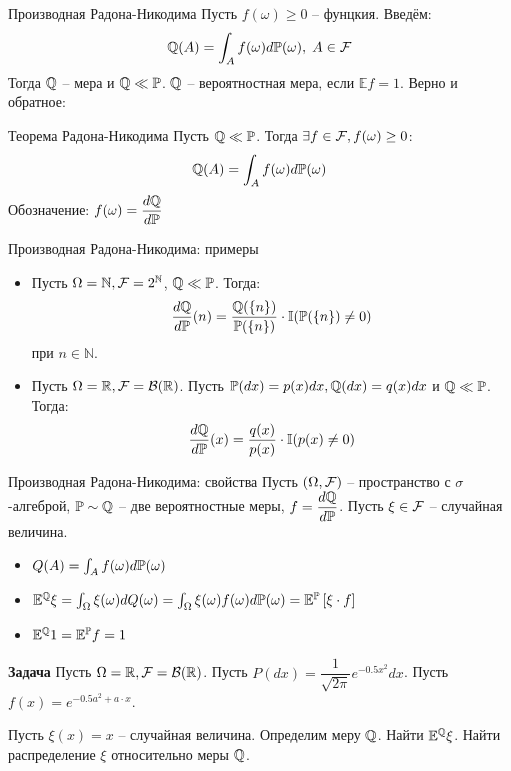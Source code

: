 \documentclass{beamer}
\begin{document}
\begin{frame}{Производная Радона-Никодима}
    Пусть $f(\omega) \geq 0 $ -- фунцкия. Введём:
    $$
        \mathbb{Q}(A) = \int_A f(\omega) d\mathbb{P}(\omega), \; A \in \mathcal{F}
    $$Тогда $\mathbb{Q}$ -- мера и $\mathbb{Q} \ll \mathbb{P}$. $\mathbb{Q}$ -- вероятностная мера, если $\mathbb{E} f=1$. Верно и обратное:
    \begin{block}{Теорема Радона-Никодима}
        Пусть $\mathbb{Q} \ll \mathbb{P}$. Тогда $\exists f \in \mathcal{F}, f(\omega) \geq 0$:
        $$
            \mathbb{Q}(A) = \int_A f(\omega) d\mathbb{P}(\omega)
        $$Обозначение: $f(\omega) = \dfrac{d\mathbb{Q}}{d\mathbb{P}}$
    \end{block}
\end{frame}

\begin{frame}{Производная Радона-Никодима: примеры}
    \begin{itemize}
        \item     Пусть $\Omega = \mathbb{N}, \mathcal{F}=2^{\mathbb{N}}$, $\mathbb{Q} \ll \mathbb{P}$.
        Тогда:
    $$
         \dfrac{d\mathbb{Q}}{d\mathbb{P}}(n) = \dfrac{\mathbb{Q}(\{n\})}{\mathbb{P}(\{n\})} \cdot \mathbb{I}(\mathbb{P}(\{n\}) \neq 0)
    $$при $n \in \mathbb{N}$.

\item     Пусть $\Omega=\mathbb{R}, \mathcal{F} = \mathcal{B}(\mathbb{R})$. Пусть $\mathbb{P}(dx) = p(x)dx, \mathbb{Q}(dx) = q(x) dx$ и $\mathbb{Q} \ll \mathbb{P}$. Тогда:
    $$
        \dfrac{d\mathbb{Q}}{d\mathbb{P}}(x) = \dfrac{q(x)}{p(x)} \cdot \mathbb{I}(p(x) \neq 0)
    $$
    \end{itemize}
\end{frame}




\begin{frame}{Производная Радона-Никодима: свойства}
    Пусть $(\Omega, \mathcal{F})$ -- пространство с $\sigma$-алгеброй, $\mathbb{P} \sim \mathbb{Q}$ -- две вероятностные меры, $f=\dfrac{d\mathbb{Q}}{d\mathbb{P}}$.
    Пусть $\xi \in \mathcal{F}$ -- случайная величина.
    \begin{itemize}
        \item $Q(A) = \int_{A} f(\omega) d\mathbb{P}(\omega)$
        \item $\mathbb{E}^{\mathbb{Q}} \xi = \int_{\Omega} \xi(\omega) dQ(\omega) = \int_{\Omega} \xi(\omega) f(\omega) d\mathbb{P}(\omega)
        = \mathbb{E}^{\mathbb{P}} \left[\xi \cdot f\right]$ 
        \item $\mathbb{E}^{\mathbb{Q}} 1 = \mathbb{E}^{\mathbb{P}} f = 1$
    \end{itemize}

    \textbf{Задача} Пусть $\Omega=\mathbb{R}, \mathcal{F} = \mathcal{B}(\mathbb{R})$. Пусть 
    $P(dx) = \dfrac{1}{\sqrt{2\pi}}e^{-0.5x^2}dx$. Пусть $f(x) = e^{-0.5 a^2+a\cdot x}$. 
    
    Пусть $\xi(x) = x$ -- случайная величина. Определим меру $\mathbb{Q}$. Найти $\mathbb{E}^{\mathbb{Q}}\xi$. Найти распределение $\xi$ относительно меры $\mathbb{Q}$.
\end{frame}
\end{document}

